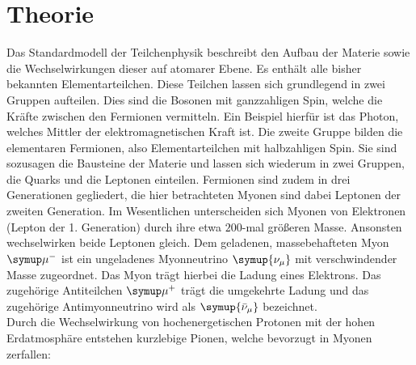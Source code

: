 \section{Theorie}
\label{sec:Theorie}
Das Standardmodell der Teilchenphysik beschreibt den Aufbau der Materie sowie die Wechselwirkungen dieser auf atomarer Ebene.
Es enthält alle bisher bekannten Elementarteilchen. Diese Teilchen lassen sich grundlegend in zwei Gruppen aufteilen.
Dies sind die Bosonen mit ganzzahligen Spin, welche die Kräfte zwischen den Fermionen vermitteln. Ein Beispiel hierfür ist das Photon, welches Mittler der elektromagnetischen Kraft ist.
Die zweite Gruppe bilden die elementaren Fermionen, also Elementarteilchen mit halbzahligen Spin. Sie sind sozusagen die Bausteine der Materie und lassen sich wiederum in zwei Gruppen, die Quarks und die Leptonen einteilen.
Fermionen sind zudem in drei Generationen gegliedert, die hier betrachteten Myonen sind dabei Leptonen der zweiten Generation.
Im Wesentlichen unterscheiden sich Myonen von Elektronen (Lepton der 1. Generation) durch ihre etwa $200$-mal größeren Masse. Ansonsten wechselwirken beide Leptonen gleich.
Dem geladenen, massebehafteten Myon $\symup\mu^-$ ist ein ungeladenes Myonneutrino $\symup{\nu_{\mu}}$ mit verschwindender Masse zugeordnet. Das Myon trägt hierbei die Ladung eines Elektrons. Das zugehörige Antiteilchen $\symup\mu^+$ trägt die umgekehrte Ladung und das zugehörige Antimyonneutrino wird als $\symup{\bar{\nu}_{\mu}}$ bezeichnet.
\\
Durch die Wechselwirkung von hochenergetischen Protonen mit der hohen Erdatmosphäre entstehen kurzlebige Pionen, welche bevorzugt in Myonen zerfallen:

